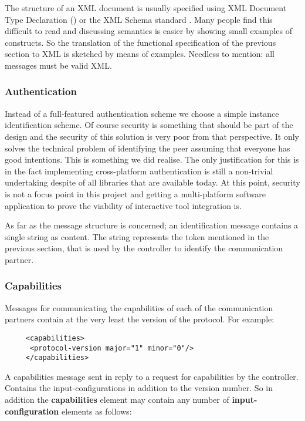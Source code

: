 \documentclass{article}
\begin{document}
   The structure of an XML document is usually specified using XML Document
   Type Declaration (\cite{Sperberg-McQueen:06:EML}) or the XML Schema standard
   \cite{Malhotra:06:XSP}. Many people find this difficult to read and
   discussing semantics is easier by showing small examples of constructs. So
   the translation of the functional specification of the previous section to
   XML is sketched by means of examples. Needless to mention: all messages must
   be valid XML.

  \subsubsection{Authentication}

   Instead of a full-featured authentication scheme we choose a simple instance
   identification scheme. Of course security is something that should be part
   of the design and the security of this solution is very poor from that
   perspective. It only solves the technical problem of identifying the peer
   assuming that everyone has good intentions. This is something we did
   realise. The only justification for this is in the fact implementing
   cross-platform authentication is still a non-trivial undertaking despite of
   all libraries that are available today.  At this point, security is not a
   focus point in this project and getting a multi-platform software
   application to prove the viability of interactive tool integration is.

   As far as the message structure is concerned; an identification message
   contains a single string as content. The string represents the token
   mentioned in the previous section, that is used by the controller to
   identify the communication partner.

  \subsubsection{Capabilities}

   Messages for communicating the capabilities of each of the communication
   partners contain at the very least the version of the protocol. For example:

    \begin{verbatim}
     <capabilities>
      <protocol-version major="1" minor="0"/>
     </capabilities>\end{verbatim}

   A capabilities message sent in reply to a request for capabilities by the
   controller. Contains the input-configurations in addition to the version
   number. So in addition the \textbf{capabilities} element may contain any
   number of \textbf{input-configuration} elements as follows:
\end{document}
